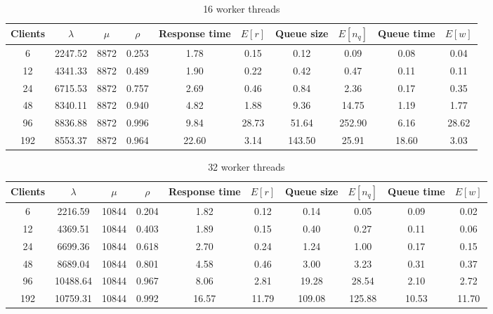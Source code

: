 \documentclass[11pt,a4paper]{article}
\begin{document}
\begin{table}[H]
\centering
\begin{tabular}{@{}c|ccc|cc|cc|cc@{}}
\toprule
Clients & $\lambda$ & $\mu$ & $\rho$ & Response time & $E[r]$ & Queue size & $E[n_q]$ & Queue time & $E[w]$ \\ \midrule
6   & 2247.52 & 8872 & 0.253 & 1.78  & 0.15  & 0.12  & 0.09   & 0.08  & 0.04 \\
12  & 4341.33 & 8872 & 0.489 & 1.90  & 0.22  & 0.42  & 0.47   & 0.11  & 0.11 \\
24  & 6715.53 & 8872 & 0.757 & 2.69  & 0.46  & 0.84  & 2.36   & 0.17  & 0.35 \\
48  & 8340.11 & 8872 & 0.940 & 4.82  & 1.88  & 9.36  & 14.75  & 1.19  & 1.77 \\
96  & 8836.88 & 8872 & 0.996 & 9.84  & 28.73 & 51.64 & 252.90 & 6.16  & 28.62 \\
192 & 8553.37 & 8872 & 0.964 & 22.60 & 3.14  & 143.50 & 25.91  & 18.60 & 3.03 \\ \bottomrule
\end{tabular}
\caption{16 worker threads}
\end{table}


\begin{table}[H]
\centering
\begin{tabular}{@{}c|ccc|cc|cc|cc@{}}
\toprule
Clients & $\lambda$ & $\mu$ & $\rho$ & Response time & $E[r]$ & Queue size & $E[n_q]$ & Queue time & $E[w]$ \\ \midrule
6   & 2216.59  & 10844 & 0.204 & 1.82  & 0.12  & 0.14  & 0.05   & 0.09  & 0.02 \\
12  & 4369.51  & 10844 & 0.403 & 1.89  & 0.15  & 0.40  & 0.27   & 0.11  & 0.06 \\
24  & 6699.36  & 10844 & 0.618 & 2.70  & 0.24  & 1.24  & 1.00   & 0.17  & 0.15 \\
48  & 8689.04  & 10844 & 0.801 & 4.58  & 0.46  & 3.00  & 3.23   & 0.31  & 0.37 \\
96  & 10488.64 & 10844 & 0.967 & 8.06  & 2.81  & 19.28  & 28.54  & 2.10  & 2.72 \\
192 & 10759.31 & 10844 & 0.992 & 16.57 & 11.79 & 109.08 & 125.88 & 10.53 & 11.70 \\ \bottomrule
\end{tabular}
\caption{32 worker threads}
\end{table}
\end{document}
